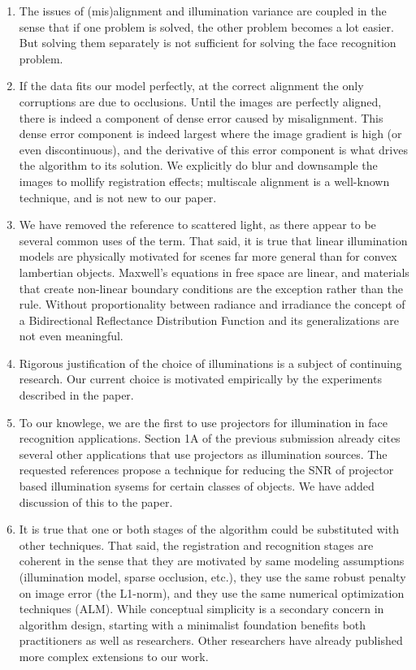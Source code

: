 \documentclass[11pt]{article}
\begin{document}
\begin{enumerate}
\item The issues of (mis)alignment and illumination variance are coupled in the
sense that if one problem is solved, the other problem becomes a lot easier.
But solving them separately is not sufficient for solving the face recognition
problem. 

\item If the data fits our model perfectly, at the correct alignment the only
corruptions are due to occlusions.  Until the images are perfectly aligned,
there is indeed a component of dense error caused by misalignment.  This dense
error component is indeed largest where the image gradient is high (or even
discontinuous), and the derivative of this error component is what drives the
algorithm to its solution.  We explicitly do blur and downsample the images to
mollify registration effects; multiscale alignment is a well-known technique,
and is not new to our paper.  

\item We have removed the reference to scattered light, as there appear to be
several common uses of the term.  That said, it is true that linear
illumination models are physically motivated for scenes far more general than
for convex lambertian objects.  Maxwell's equations in free space are linear,
and materials that create non-linear boundary conditions are the exception
rather than the rule.  Without proportionality between radiance and irradiance
the concept of a Bidirectional Reflectance Distribution Function and its
generalizations are not even meaningful. 

\item Rigorous justification of the choice of illuminations is a subject of
continuing research.  Our current choice is motivated empirically by the
experiments described in the paper. 

\item To our knowlege, we are the first to use projectors for illumination in
face recognition applications.  Section 1A of the previous submission already
cites several other applications that use projectors as illumination sources.
The requested references propose a technique for reducing the SNR of projector
based illumination sysems for certain classes of objects.  We have added
discussion of this to the paper.

\item  It is true that one or both stages of the algorithm could be substituted
with other techniques.  That said, the registration and recognition stages are
coherent in the sense that they are motivated by same modeling assumptions
(illumination model, sparse occlusion, etc.), they use the same robust penalty
on image error (the L1-norm), and they use the same numerical optimization
techniques (ALM).  While conceptual simplicity is a secondary concern in
algorithm design, starting with a minimalist foundation benefits both
practitioners as well as researchers.  Other researchers have already published
more complex extensions to our work. 


\end{enumerate}
\end{document}
